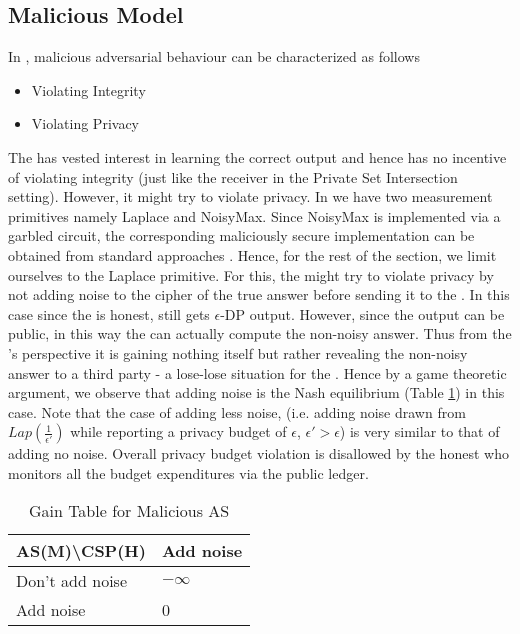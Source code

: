 \subsection{Malicious Model}
In \system, malicious adversarial behaviour can be characterized as follows \begin{itemize}\item Violating Integrity  \item Violating Privacy \end{itemize}

The \AS has vested interest in learning the correct output and hence has no incentive of violating integrity (just like the receiver in the Private Set Intersection setting).
 However, it might try to violate privacy. In \system we have two measurement primitives namely \textsf{Laplace} and \textsf{NoisyMax}. Since \textsf{NoisyMax} is implemented via a garbled circuit, the corresponding maliciously secure implementation can be obtained from standard approaches \cite{Wang:2017:AGE:3133956.3134053}. Hence, for the rest of the section, we limit ourselves to the \textsf{Laplace} primitive. For this, the \AS might try to violate privacy by not adding noise to the cipher of the true answer before sending it to the \CSP. In this case since the \CSP is honest, \AS still gets $\epsilon$-DP output.
However, since the output can be public, in this way the \CSP can actually compute the non-noisy answer.
Thus from the \AS's perspective it is gaining nothing itself but rather revealing the non-noisy answer to a third party \CSP - a lose-lose situation for the \AS. Hence by a game theoretic argument, we observe that adding noise is the Nash equilibrium (Table \ref{tab:Malicous_AS}) in this case.
Note that the case of adding less noise, (i.e. adding noise drawn from $Lap(\frac{1}{\epsilon'})$ while reporting a privacy budget of $\epsilon$, $\epsilon' > \epsilon$) is very similar to that of adding no noise.
Overall privacy budget violation is disallowed by the honest \CSP who monitors all the budget expenditures via the public ledger.
\begin{table}\caption{Gain Table for Malicious AS}
\begin{tabular}{|l|l|}
\hline
AS(M)\textbackslash CSP(H) & Add noise\\
\hline
 Don't add noise& $-\infty$    \\\hline
 Add noise & 0   \\
 \hline
\end{tabular}\label{tab:Malicous_AS}
\end{table}

